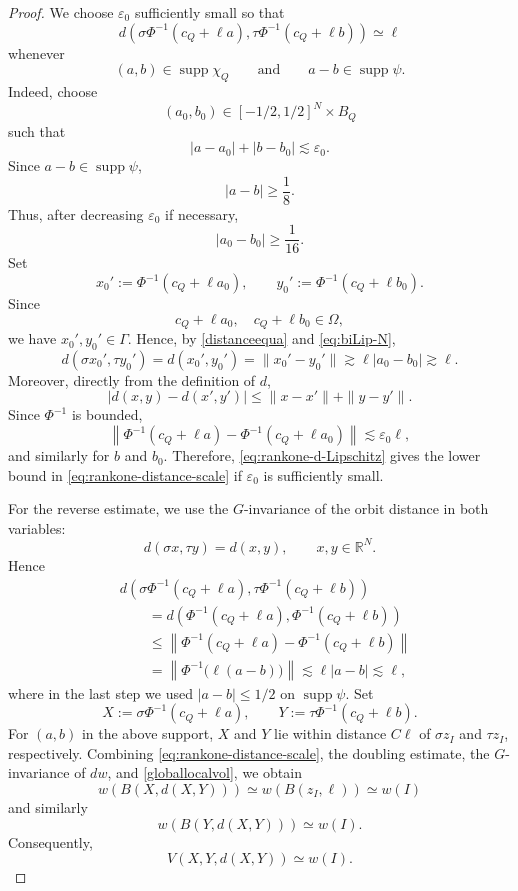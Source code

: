 \documentclass[12pt]{amsart}
\begin{document}
\begin{proof}
We choose $\varepsilon_0$ sufficiently small so that
\begin{equation}\label{eq:rankone-distance-scale}
d\left(
\sigma\Phi^{-1}(c_Q+\ell a),
\tau\Phi^{-1}(c_Q+\ell b)
\right)
\simeq\ell
\end{equation}
whenever
\[
(a,b)\in\operatorname{supp}\chi_Q
\qquad\text{and}\qquad
a-b\in\operatorname{supp}\psi.
\]
Indeed, choose
\[
(a_0,b_0)
\in
[-1/2,1/2]^N\times B_Q
\]
such that
\[
|a-a_0|+|b-b_0|
\lesssim\varepsilon_0.
\]
Since $a-b\in\operatorname{supp}\psi$,
\[
|a-b|\geq\frac18.
\]
Thus, after decreasing $\varepsilon_0$ if necessary,
\[
|a_0-b_0|\geq\frac1{16}.
\]
Set
\[
x_0'
:=
\Phi^{-1}(c_Q+\ell a_0),
\qquad
y_0'
:=
\Phi^{-1}(c_Q+\ell b_0).
\]
Since
\[
c_Q+\ell a_0,\quad c_Q+\ell b_0\in\Omega,
\]
we have $x_0',y_0'\in\Gamma$. Hence, by
\eqref{distanceequa} and \eqref{eq:biLip-N},
\[
d(\sigma x_0',\tau y_0')
=
d(x_0',y_0')
=
\|x_0'-y_0'\|
\gtrsim
\ell|a_0-b_0|
\gtrsim\ell.
\]
Moreover, directly from the definition of $d$,
\begin{equation}\label{eq:rankone-d-Lipschitz}
|d(x,y)-d(x',y')|
\leq
\|x-x'\|+\|y-y'\|.
\end{equation}
Since $\Phi^{-1}$ is bounded,
\[
\left\|
\Phi^{-1}(c_Q+\ell a)
-
\Phi^{-1}(c_Q+\ell a_0)
\right\|
\lesssim
\varepsilon_0\ell,
\]
and similarly for $b$ and $b_0$. Therefore,
\eqref{eq:rankone-d-Lipschitz} gives the lower bound in
\eqref{eq:rankone-distance-scale} if $\varepsilon_0$ is sufficiently
small.

For the reverse estimate, we use the $G$-invariance of the orbit
distance in both variables:
\[
d(\sigma x,\tau y)=d(x,y),
\qquad x,y\in\mathbb R^N.
\]
Hence
\begin{align*}
&d\left(
\sigma\Phi^{-1}(c_Q+\ell a),
\tau\Phi^{-1}(c_Q+\ell b)
\right)
\\
&\qquad=
d\left(
\Phi^{-1}(c_Q+\ell a),
\Phi^{-1}(c_Q+\ell b)
\right)
\\
&\qquad\leq
\left\|
\Phi^{-1}(c_Q+\ell a)
-
\Phi^{-1}(c_Q+\ell b)
\right\|
\\
&\qquad=
\left\|
\Phi^{-1}\bigl(\ell(a-b)\bigr)
\right\|
\lesssim
\ell |a-b|
\lesssim
\ell,
\end{align*}
where in the last step we used
$|a-b|\leq 1/2$ on $\operatorname{supp}\psi$.
Set
\[
X:=
\sigma\Phi^{-1}(c_Q+\ell a),
\qquad
Y:=
\tau\Phi^{-1}(c_Q+\ell b).
\]
For $(a,b)$ in the above support, $X$ and $Y$ lie within distance
$C\ell$ of $\sigma z_I$ and $\tau z_I$, respectively. Combining
\eqref{eq:rankone-distance-scale}, the doubling estimate,
the $G$-invariance of $dw$, and \eqref{globallocalvol}, we obtain
\[
w(B(X,d(X,Y)))
\simeq
w(B(z_I,\ell))
\simeq
w(I)
\]
and similarly
\[
w(B(Y,d(X,Y)))
\simeq
w(I).
\]
Consequently,
\begin{equation}\label{eq:rankone-V-I}
V(X,Y,d(X,Y))
\simeq
w(I).
\end{equation}


\end{proof}
\end{document}
